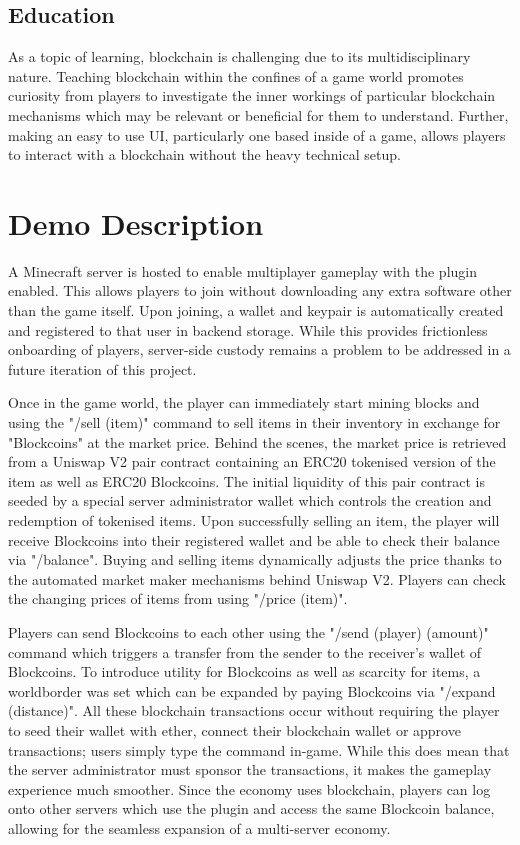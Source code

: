 \documentclass[conference]{IEEEtran}
\begin{document}
\subsection{Education}
As a topic of learning, blockchain is challenging due to its multidisciplinary nature. Teaching blockchain within the confines of a game world promotes curiosity from players to investigate the inner workings of particular blockchain mechanisms which may be relevant or beneficial for them to understand. Further, making an easy to use UI, particularly one based inside of a game, allows players to interact with a blockchain without the heavy technical setup.


\section{Demo Description}
A Minecraft server is hosted to enable multiplayer gameplay with the plugin enabled. This allows players to join without downloading any extra software other than the game itself. Upon joining, a wallet and keypair is automatically created and registered to that user in backend storage. While this provides frictionless onboarding of players, server-side custody remains a problem to be addressed in a future iteration of this project.

Once in the game world, the player can immediately start mining blocks and using the "/sell (item)" command to sell items in their inventory in exchange for "Blockcoins" at the market price. Behind the scenes, the market price is retrieved from a Uniswap V2 pair contract containing an ERC20 tokenised version of the item as well as ERC20 Blockcoins. The initial liquidity of this pair contract is seeded by a special server administrator wallet which controls the creation and redemption of tokenised items. Upon successfully selling an item, the player will receive Blockcoins into their registered wallet and be able to check their balance via "/balance". Buying and selling items dynamically adjusts the price thanks to the automated market maker mechanisms behind Uniswap V2. Players can check the changing prices of items from using "/price (item)".

Players can send Blockcoins to each other using the "/send (player) (amount)" command which triggers a transfer from the sender to the receiver's wallet of Blockcoins. To introduce utility for Blockcoins as well as scarcity for items, a worldborder was set which can be expanded by paying Blockcoins via "/expand (distance)". 
All these blockchain transactions occur without requiring the player to seed their wallet with ether, connect their blockchain wallet or approve transactions; users simply type the command in-game. While this does mean that the server administrator must sponsor the transactions, it makes the gameplay experience much smoother. Since the economy uses blockchain, players can log onto other servers which use the plugin and access the same Blockcoin balance, allowing for the seamless expansion of a multi-server economy.
\end{document}
